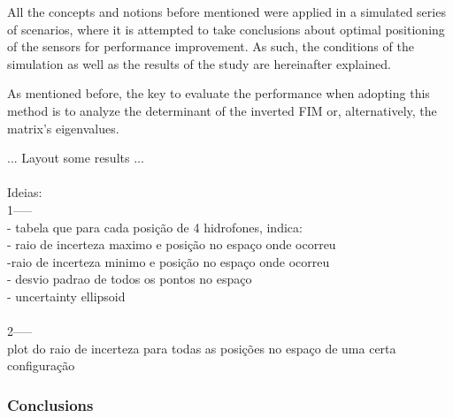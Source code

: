 All the concepts and notions before mentioned were applied in a simulated series of scenarios, where it is attempted to take conclusions about optimal positioning of the sensors for performance improvement. As such, the conditions of the simulation as well as the results of the study are hereinafter explained.

As mentioned before, the key to evaluate the performance when adopting this method is to analyze the determinant of the inverted FIM or, alternatively, the matrix's eigenvalues.




... Layout some results ... 
\\
\\
Ideias:
\\
1-----
\\
- tabela que para cada posição de 4 hidrofones, indica:
\\
- raio de incerteza maximo e posição no espaço onde ocorreu
\\
-raio de incerteza minimo e posição no espaço onde ocorreu
\\
- desvio padrao de todos os pontos no espaço
\\
- uncertainty ellipsoid 
\\
\\
2-----
\\
plot do raio de incerteza para todas as posições no espaço de uma certa configuração

\subsubsection{Conclusions}